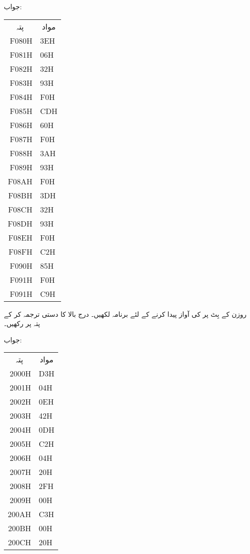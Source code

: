 جواب:
\begin{center}
\begin{tabular}{rl}
\multicolumn{1}{c}{پتہ}&\multicolumn{1}{c}{مواد}\\[1ex]
F080H&3EH\\
F081H&06H\\
F082H&32H\\
F083H&93H\\
F084H&F0H\\
F085H&CDH\\
F086H&60H\\
F087H&F0H\\
F088H&3AH\\
F089H&93H\\
F08AH&F0H\\
F08BH&3DH\\
F08CH&32H\\
F08DH&93H\\
F08EH&F0H\\
F08FH&C2H\\
F090H&85H\\
F091H&F0H\\
F091H&C9H
\end{tabular}
\end{center}
روزن  کے بِٹ  پر   کی آواز پیدا کرنے کے لئے برنامہ لکھیں۔
درج بالا کا دستی ترجمہ کر کے پتہ  پر رکھیں۔

جواب:
\begin{center}
\begin{tabular}{rl}
\multicolumn{1}{c}{پتہ}&\multicolumn{1}{c}{مواد}\\[1ex]
2000H&D3H\\
2001H&04H\\
2002H&0EH\\
2003H&42H\\
2004H&0DH\\
2005H&C2H\\
2006H&04H\\
2007H&20H\\
2008H&2FH\\
2009H&00H\\
200AH&C3H\\
200BH&00H\\
200CH&20H
\end{tabular}
\end{center}

